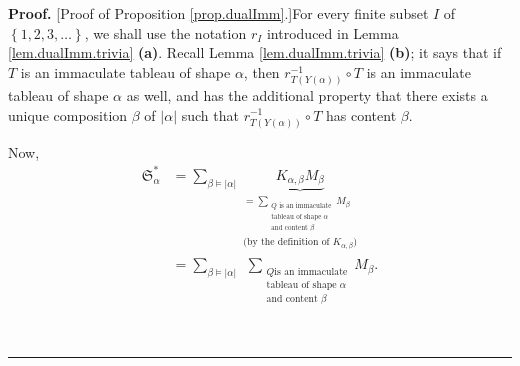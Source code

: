 \documentclass[numbers=enddot,12pt,final,onecolumn,notitlepage,abstracton]{scrartcl}%
\theoremstyle{definition}
\newenvironment{proof}[1][Proof]{\noindent\textbf{#1.} }{\ \rule{0.5em}{0.5em}}
\let\sumnonlimits\sum
\renewcommand{\sum}{\sumnonlimits\limits}
\begin{document}
\begin{proof}
[Proof of Proposition \ref{prop.dualImm}.]For every finite subset $I$ of
$\left\{  1,2,3,\ldots\right\}  $, we shall use the notation $r_{I}$
introduced in Lemma \ref{lem.dualImm.trivia} \textbf{(a)}. Recall Lemma
\ref{lem.dualImm.trivia} \textbf{(b)}; it says that if $T$ is an immaculate
tableau of shape $\alpha$, then $r_{T\left(  Y\left(  \alpha\right)  \right)
}^{-1}\circ T$ is an immaculate tableau of shape $\alpha$ as well, and has the
additional property that there exists a unique composition $\beta$ of
$\left\vert \alpha\right\vert $ such that $r_{T\left(  Y\left(  \alpha\right)
\right)  }^{-1}\circ T$ has content $\beta$.

Now,
\begin{align}
\mathfrak{S}_{\alpha}^{\ast}  & =\sum_{\beta\models\left\vert \alpha
\right\vert }\underbrace{K_{\alpha,\beta}M_{\beta}}_{\substack{=\sum
_{\substack{Q\text{ is an immaculate}\\\text{tableau of shape }\alpha
\\\text{and content }\beta}}M_{\beta}\\\text{(by the definition of }%
K_{\alpha,\beta}\text{)}}}\nonumber\\
& =\sum_{\beta\models\left\vert \alpha\right\vert }\ \ \sum_{\substack{Q\text{
is an immaculate}\\\text{tableau of shape }\alpha\\\text{and content }\beta
}}M_{\beta}.\label{pf.dualImm.1}%
\end{align}



\end{proof}
\end{document}

